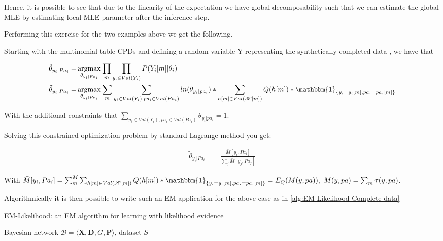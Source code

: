 \documentclass[11pt]{article}
\begin{document}
\begin{article}
Hence, it is possible to see that due to the linearity of the
expectation we have global decomposability such that we can
estimate the global MLE by estimating local MLE parameter after
the inference step.

Performing this exercise for the two examples above we get the
following.

Starting with the multinomial table CPDs and defining a random
variable Y representing the synthetically completed data \(<H, D>\),
we have that

\begin{align} \label{eq:solution}
\tilde{\theta}_{y_i | Pa_i} =& \operatorname*{argmax}_{\theta_{y_i | Pa_i}}  \prod_m \prod_{y_i \in Val(Y_i)} P(Y_i[m]|\theta_i) \nonumber  \\
\tilde{\theta}_{y_i | Pa_i} =& \operatorname*{argmax}_{\theta_{y_i | Pa_i}} \sum_m \sum_{y_i \in Val(Y_i), pa_i \in Val(Pa_i)} ln(\theta_{y_i | pa_i}) * \sum_{h[m] \in Val(\mathscr{H}[m])} Q(h[m]) * \mathbbm{1}_{\{y_i = y_i[m], pa_i = pa_i[m]\}}
\end{align}

With the additional constraints that \(\sum_{y_i \in Val(Y_i), pa_i
    \in Val(Pa_i)} \theta_{y_i | pa_i} = 1\).

Solving this constrained optimization problem by standard
Lagrange method you get: 

\begin{align} \label{eq:solution}
\tilde{\theta}_{y_i | Pa_i} =& \frac{\bar{M}[y_i, Pa_i]}{\sum_j \bar{M}[y_j, Pa_j]}
\end{align}

With \(\bar{M}[y_i, Pa_i] = \sum_m^M \sum_{h[m] \in
    Val(\mathscr{H}[m])} Q(h[m]) * \mathbbm{1}_{\{y_i = y_i[m], pa_i =
    pa_i[m]\}} = E_Q(M(y, pa)), \ M(y, pa) = \sum_m \tau(y,pa)\).

Algorithmically it is then possible to write such an EM-application for
the above case as in \ref{alg:EM-Likelihood-Complete data}

\algrenewcommand\algorithmicindent{1.5em}%

\begin{algorithm*}[h!]
\caption{EM-Likelihood: an EM algorithm for learning with likelihood evidence}
\label{alg:EM-Likelihood-Complete data}
\vspace{-10pt}
\begin{multicols}{2}
\begin{algorithmic}[1] 
\Require Bayesian network $\mathcal{B}=\langle \mathbf{X},\mathbf{D}, G, \mathbf{P} \rangle$, dataset $S$ 


\end{algorithmic}
\end{multicols}
\end{algorithm*}
\end{article}
\end{document}
